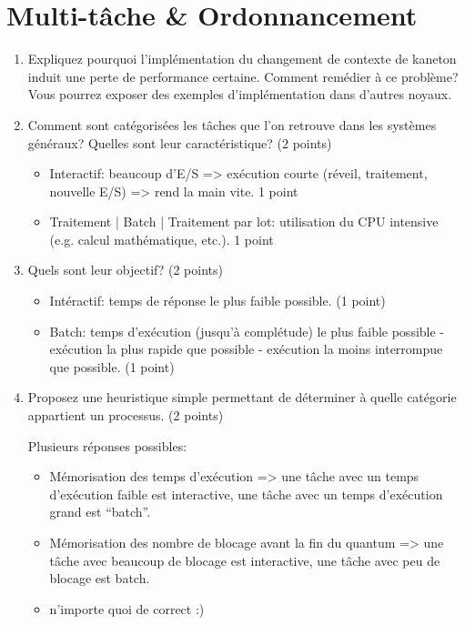\section{{Multi-tâche \& Ordonnancement}
         {\hfill{} }}

\begin{enumerate}

\item Expliquez pourquoi l'implémentation du changement de contexte de
      kaneton induit une perte de performance certaine. Comment remédier à
      ce problème? Vous pourrez exposer des exemples d'implémentation dans
      d'autres noyaux.


\item Comment sont catégorisées les tâches que l'on retrouve dans les systèmes généraux? Quelles sont leur caractéristique? (2 points)

\begin{correction}
\begin{itemize}
  \item Interactif: beaucoup d'E/S => exécution courte (réveil, traitement, nouvelle E/S) => rend la main vite.  1 point
  \item Traitement | Batch | Traitement par lot: utilisation du CPU intensive (e.g. calcul mathématique, etc.). 1 point
\end{itemize}
\end{correction}


\item Quels sont leur objectif? (2 points)

\begin{correction}
\begin{itemize}
  \item Intéractif: temps de réponse le plus faible possible. (1 point)
  \item Batch: temps d'exécution (jusqu'à complétude) le plus faible possible - exécution la plus rapide que possible - exécution la moins interrompue que possible. (1 point)
\end{itemize}
\end{correction}


\item Proposez une heuristique simple permettant de déterminer à quelle catégorie appartient un processus. (2 points)

\begin{correction}
Plusieurs réponses possibles:
\begin{itemize}
  \item Mémorisation des temps d'exécution => une tâche avec un temps d'exécution faible est interactive, une tâche avec un temps d'exécution grand est “batch”.
  \item Mémorisation des nombre de blocage avant la fin du quantum => une tâche avec beaucoup de blocage est interactive, une tâche avec peu de blocage est batch.
  \item n'importe quoi de correct :)
\end{itemize}
\end{correction}



\end{enumerate}
